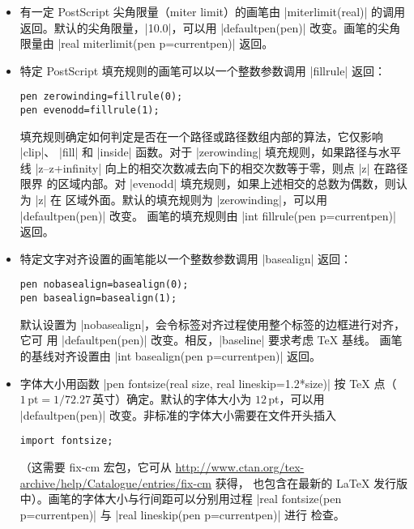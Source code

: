 \documentclass{ctexbook}
\newcommand*\prgname[1]{\textsf{#1}}
\begin{document}
\begin{itemize}
\item 有一定 \prgname{PostScript} 尖角限量（miter limit）的画笔由
  |miterlimit(real)| 的调用返回。默认的尖角限量，|10.0|，可以用
  |defaultpen(pen)| 改变。画笔的尖角限量由 |real miterlimit(pen p=currentpen)|
  返回。

\item 特定 \prgname{PostScript} 填充规则的画笔可以以一个整数参数调用
  |fillrule| 返回：
\begin{lstlisting}
pen zerowinding=fillrule(0);
pen evenodd=fillrule(1);
\end{lstlisting}
  填充规则确定如何判定是否在一个路径或路径数组内部的算法，它仅影响 |clip|、
  |fill| 和 |inside| 函数。对于 |zerowinding| 填充规则，如果路径与水平线
  |z--z+infinity| 向上的相交次数减去向下的相交次数等于零，则点 |z| 在路径限界
  的区域内部。对 |evenodd| 填充规则，如果上述相交的总数为偶数，则认为 |z| 在
  区域外面。默认的填充规则为 |zerowinding|，可以用 |defaultpen(pen)| 改变。
  画笔的填充规则由 |int fillrule(pen p=currentpen)| 返回。

\item 特定文字对齐设置的画笔能以一个整数参数调用 |basealign| 返回：
\begin{lstlisting}
pen nobasealign=basealign(0);
pen basealign=basealign(1);
\end{lstlisting}
  默认设置为 |nobasealign|，会令标签对齐过程使用整个标签的边框进行对齐，它可
  用 |defaultpen(pen)| 改变。相反，|baseline| 要求考虑 \TeX{} 基线。
  画笔的基线对齐设置由 |int basealign(pen p=currentpen)| 返回。

\item 字体大小用函数 |pen fontsize(real size, real lineskip=1.2*size)| 按
  \TeX{} 点（$1\,\text{pt}=1/72.27 \,\text{英寸}$）确定。默认的字体大小为
  $12$\,pt，可以用 |defaultpen(pen)| 改变。非标准的字体大小需要在文件开头插入
\index{fontsize.asy@\prgname{fontsize.asy}}
\begin{lstlisting}
import fontsize;
\end{lstlisting}
  （这需要 \prgname{fix-cm} 宏包，它可从
  \url{http://www.ctan.org/tex-archive/help/Catalogue/entries/fix-cm} 获得，
  也包含在最新的 \LaTeX{} 发行版中）。画笔的字体大小与行间距可以分别用过程
  |real fontsize(pen p=currentpen)| 与 |real lineskip(pen p=currentpen)| 进行
  检查。


\end{itemize}
\end{document}
